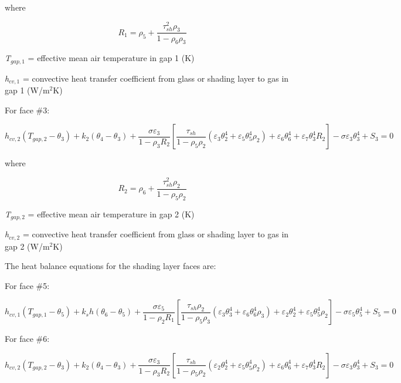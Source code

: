 where

\begin{equation}
{R_1} = {\rho_5} + \frac{{\tau_{sh}^2{\rho_3}}}{{1 - {\rho_6}{\rho_3}}}
\end{equation}

\emph{T\(_{gap,1}\)} = effective mean air temperature in gap 1 (K)

\emph{h\(_{cv,1}\)} = convective heat transfer coefficient from glass or shading layer to gas in gap 1 (W/m\(^{2}\)K)

For face \#3:

\begin{equation}
h_{cv,2} (T_{gap,2}-\theta_3) + k_2 (\theta_4-\theta_3) +
    \frac{\sigma \varepsilon_3}{1-\rho_3 R_2} \left[
      \frac{\tau_{sh}}{1-\rho_5\rho_2} (
        \varepsilon_3 \theta_2^4 + \varepsilon_5\theta_5^4\rho_2
      )
      + \varepsilon_6\theta_6^4 + \varepsilon_7\theta_3^4R_2
    \right]-{\sigma \varepsilon_3 \theta_3^4}+{S_3}=0
\end{equation}

where

\begin{equation}
{R_2} = {\rho_6} + \frac{{\tau_{sh}^2{\rho_2}}}{{1 - {\rho_5}{\rho_2}}}
\end{equation}

\emph{T\(_{gap,2}\)} = effective mean air temperature in gap 2 (K)

\emph{h\(_{cv,2}\)} = convective heat transfer coefficient from glass or shading layer to gas in gap 2 (W/m\(^{2}\)K)

The heat balance equations for the shading layer faces are:

For face \#5:

\begin{equation}
h_{cv,1} (T_{gap,1}-\theta_5) + k_sh (\theta_6-\theta_5) +
    \frac{\sigma \varepsilon_5}{1-\rho_2 R_1} \left[
      \frac{\tau_{sh}\rho_2}{1-\rho_5\rho_3} (
        \varepsilon_3 \theta_3^4 + \varepsilon_6\theta_6^4\rho_3
      )
      + \varepsilon_2\theta_2^4 + \varepsilon_5\theta_5^4\rho_2
    \right]-{\sigma \varepsilon_5 \theta_5^4}+{S_5}=0
\end{equation}

For face \#6:

\begin{equation}
h_{cv,2} (T_{gap,2}-\theta_3) + k_2 (\theta_4-\theta_3) +
    \frac{\sigma \varepsilon_3}{1-\rho_3 R_2} \left[
      \frac{\tau_{sh}}{1-\rho_5\rho_2} (
        \varepsilon_2 \theta_2^4 + \varepsilon_5\theta_5^4\rho_2
      )
      + \varepsilon_6\theta_6^4 + \varepsilon_7\theta_3^4R_2
    \right]-{\sigma \varepsilon_3 \theta_3^4}+{S_3}=0
\end{equation}

